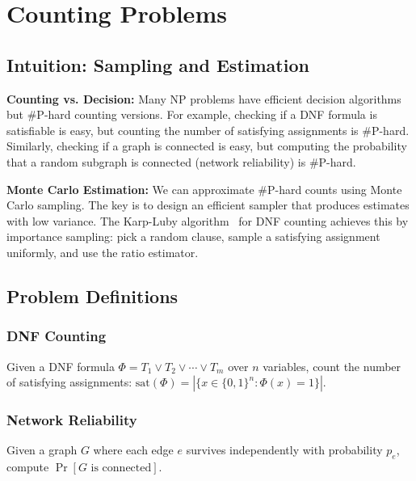 \setcounter{chapter}{27}
\chapter{Counting Problems}
\label{ch:counting}

\section{Intuition: Sampling and Estimation}

\begin{intuitionbox}
\textbf{Counting vs. Decision:} Many NP problems have efficient decision algorithms but $\#$P-hard counting versions. For example, checking if a DNF formula is satisfiable is easy, but counting the number of satisfying assignments is $\#$P-hard. Similarly, checking if a graph is connected is easy, but computing the probability that a random subgraph is connected (network reliability) is $\#$P-hard.

\textbf{Monte Carlo Estimation:} We can approximate $\#$P-hard counts using Monte Carlo sampling. The key is to design an efficient sampler that produces estimates with low variance. The Karp-Luby algorithm~\cite{karp-luby83} for DNF counting achieves this by importance sampling: pick a random clause, sample a satisfying assignment uniformly, and use the ratio estimator.
\end{intuitionbox}

\section{Problem Definitions}

\subsection{DNF Counting}
Given a DNF formula $\Phi = T_1 \vee T_2 \vee \cdots \vee T_m$ over $n$ variables, count the number of satisfying assignments: $\text{sat}(\Phi) = |\{x \in \{0,1\}^n : \Phi(x) = 1\}|$.

\subsection{Network Reliability}
Given a graph $G$ where each edge $e$ survives independently with probability $p_e$, compute $\Pr[G \text{ is connected}]$.


